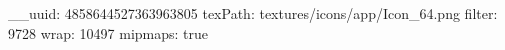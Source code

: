 __uuid: 4858644527363963805
texPath: textures/icons/app/Icon_64.png
filter: 9728
wrap: 10497
mipmaps: true